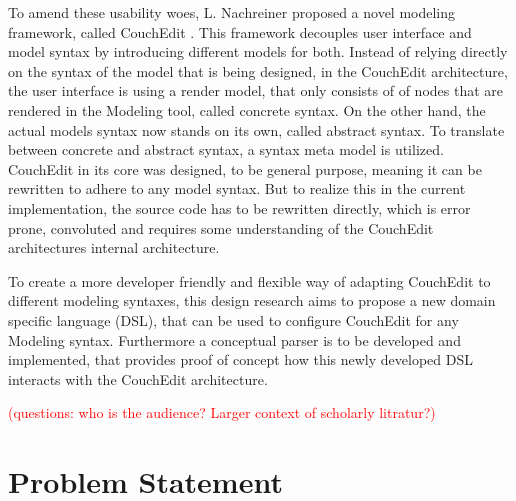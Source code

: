 \documentclass[10pt,a4paper,oneside]{scrartcl}
\newcommand\comment[1]{\textcolor{red}{(#1)}}
\begin{document}
    To amend these usability woes, L. Nachreiner proposed a novel modeling framework, called CouchEdit \cite{nachreiner_couchedit_2020}. This framework decouples user interface and model syntax by introducing different models for both. Instead of relying directly on the syntax of the model that is being designed, in the CouchEdit architecture, the user interface is using a render model, that only consists of of nodes that are rendered in the Modeling tool, called concrete syntax. On the other hand, the actual models syntax now stands on its own, called abstract syntax. To translate between concrete and abstract syntax, a syntax meta model is utilized. CouchEdit in its core was designed, to be general purpose, meaning it can be rewritten to adhere to any model syntax. But to realize this in the current implementation, the source code has to be rewritten directly, which is error prone, convoluted and requires some understanding of the CouchEdit architectures internal architecture.
    
    To create a more developer friendly and flexible way of adapting CouchEdit to different modeling syntaxes, this design research aims to propose a new 
    domain specific language (DSL), that can be used to configure CouchEdit for 
    any Modeling syntax. Furthermore a conceptual parser is to be developed and implemented, that provides proof of concept how this newly developed DSL interacts with the CouchEdit architecture.

    \comment{questions: who is the audience? Larger context of scholarly litratur?}

\section{Problem Statement}
\label{sec:problem_statement}
\end{document}

